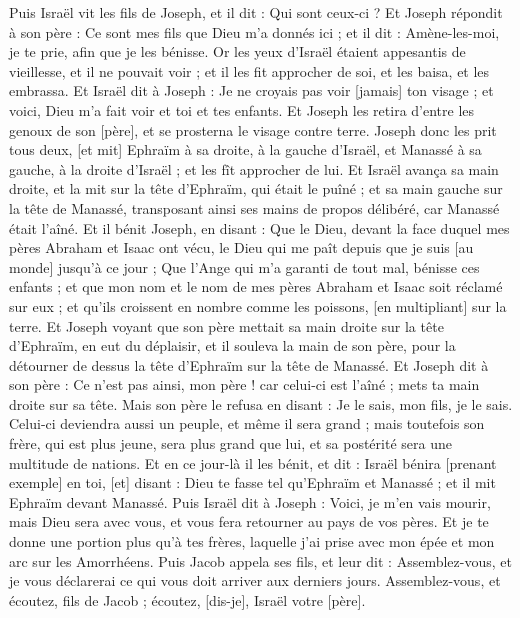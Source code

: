 \begin{multicols}{2}
Puis Israël vit les fils de Joseph, et il dit : Qui sont ceux-ci ?
Et Joseph répondit à son père : Ce sont mes fils que Dieu m'a donnés ici ; et il dit : Amène-les-moi, je te prie, afin que je les bénisse.
Or les yeux d'Israël étaient appesantis de vieillesse, et il ne pouvait voir ; et il les fit approcher de soi, et les baisa, et les embrassa.
Et Israël dit à Joseph : Je ne croyais pas voir [jamais] ton visage ; et voici, Dieu m'a fait voir et toi et tes enfants.
Et Joseph les retira d'entre les genoux de son [père], et se prosterna le visage contre terre.
Joseph donc les prit tous deux, [et mit] Ephraïm à sa droite, à la gauche d'Israël, et Manassé à sa gauche, à la droite d'Israël ; et les fît approcher de lui.
Et Israël avança sa main droite, et la mit sur la tête d'Ephraïm, qui était le puîné ; et sa main gauche sur la tête de Manassé, transposant ainsi ses mains de propos délibéré, car Manassé était l'aîné.
Et il bénit Joseph, en disant : Que le Dieu, devant la face duquel mes pères Abraham et Isaac ont vécu, le Dieu qui me paît depuis que je suis [au monde] jusqu'à ce jour ;
Que l'Ange qui m'a garanti de tout mal, bénisse ces enfants ; et que mon nom et le nom de mes pères Abraham et Isaac soit réclamé sur eux ; et qu'ils croissent en nombre comme les poissons, [en multipliant] sur la terre.
Et Joseph voyant que son père mettait sa main droite sur la tête d'Ephraïm, en eut du déplaisir, et il souleva la main de son père, pour la détourner de dessus la tête d'Ephraïm sur la tête de Manassé.
Et Joseph dit à son père : Ce n'est pas ainsi, mon père ! car celui-ci est l'aîné ; mets ta main droite sur sa tête.
Mais son père le refusa en disant : Je le sais, mon fils, je le sais. Celui-ci deviendra aussi un peuple, et même il sera grand ; mais toutefois son frère, qui est plus jeune, sera plus grand que lui, et sa postérité sera une multitude de nations.
Et en ce jour-là il les bénit, et dit : Israël bénira [prenant exemple] en toi, [et] disant : Dieu te fasse tel qu'Ephraïm et Manassé ; et il mit Ephraïm devant Manassé.
Puis Israël dit à Joseph : Voici, je m'en vais mourir, mais Dieu sera avec vous, et vous fera retourner au pays de vos pères.
Et je te donne une portion plus qu'à tes frères, laquelle j'ai prise avec mon épée et mon arc sur les Amorrhéens.
\VerseOne{}Puis Jacob appela ses fils, et leur dit : Assemblez-vous, et je vous déclarerai ce qui vous doit arriver aux derniers jours.
Assemblez-vous, et écoutez, fils de Jacob ; écoutez, [dis-je], Israël votre [père].

\end{multicols}
